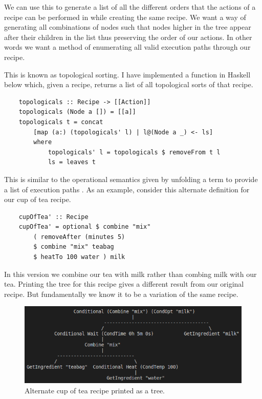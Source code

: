 \documentclass[11pt]{article}
\begin{document}
We can use this to generate a list of all
the different orders that the actions of a recipe can be performed
in while creating the same recipe. We want a way of generating
all combinations of nodes such that nodes higher in the tree
appear after their children in the list thus preserving the
order of our actions. In other words we want a method of enumerating
all valid execution paths through our recipe.

\medbreak

This is known as topological sorting. I have implemented a
function in Haskell below which, given a recipe, returns a list
of all topological sorts of that recipe.

\begin{lstlisting}
    topologicals :: Recipe -> [[Action]]
    topologicals (Node a []) = [[a]]
    topologicals t = concat
        [map (a:) (topologicals' l) | l@(Node a _) <- ls]
        where
            topologicals' l = topologicals $ removeFrom t l
            ls = leaves t
\end{lstlisting}

This is similar to the operational semantics given by unfolding a
term to provide a list of execution paths \cite{hutton}. As an example,
consider this alternate definition for our cup of tea recipe.

\begin{lstlisting}
    cupOfTea' :: Recipe
    cupOfTea' = optional $ combine "mix" 
        ( removeAfter (minutes 5)
        $ combine "mix" teabag
        $ heatTo 100 water ) milk
\end{lstlisting}

In this version we combine our tea with milk rather than combing milk with our tea.
Printing the tree for this recipe gives a different result from our original recipe.
But fundamentally we know it to be a variation of the same recipe.

\begin{figure}[h]
\includegraphics[width=\textwidth, keepaspectratio]{cupOfTea2.png}
\centering
\caption{Alternate cup of tea recipe printed as a tree.}
\end{figure}
\end{document}
